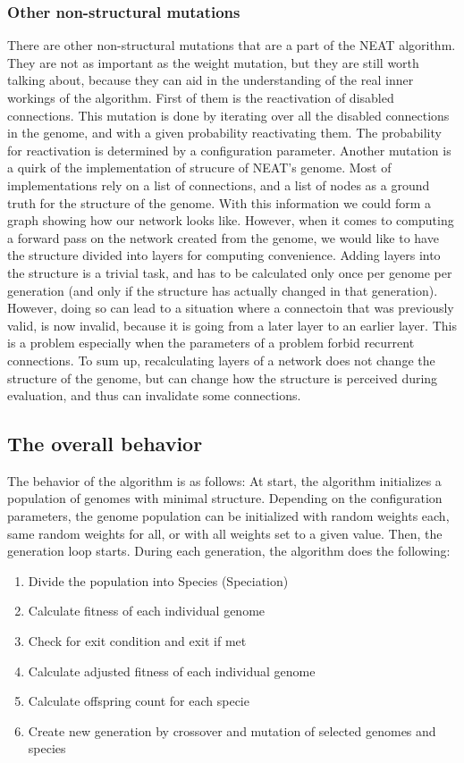 \documentclass{article}
\begin{document}
\subsubsection{Other non-structural mutations}
There are other non-structural mutations that are a part of the NEAT algorithm. They are not as important as the weight mutation, but they are still worth
talking about, because they can aid in the understanding of the real inner workings of the algorithm.
First of them is the reactivation of disabled connections. This mutation is done by iterating over all the disabled connections in the genome, and with a given
probability reactivating them. The probability for reactivation is determined by a configuration parameter.
Another mutation is a quirk of the implementation of strucure of NEAT's genome. Most of implementations rely on a list of connections, and a list of nodes as a 
ground truth for the structure of the genome. With this information we could form a graph showing how our network looks like. However, when it comes to 
computing a forward pass on the network created from the genome, we would like to have the structure divided into layers for computing convenience.
Adding layers into the structure is a trivial task, and has to be calculated only once per genome per generation (and only if the structure has actually 
changed in that generation). However, doing so can lead to a situation where a connectoin that was previously valid, is now invalid, because it
is going from a later layer to an earlier layer. This is a problem especially when the parameters of a problem forbid recurrent connections. To sum up, 
recalculating layers of a network does not change the structure of the genome, but can change how the structure is perceived during evaluation, and thus
can invalidate some connections.
\subsection{The overall behavior}
The behavior of the algorithm is as follows: 
At start, the algorithm initializes a population of genomes with minimal structure. Depending on the configuration parameters,
the genome population can be initialized with random weights each, same random weights for all, or with all weights set to a given value.
Then, the generation loop starts. During each generation, the algorithm does the following:
    \begin{enumerate}
        \item Divide the population into Species (Speciation)
        \item Calculate fitness of each individual genome
        \item Check for exit condition and exit if met
        \item Calculate adjusted fitness of each individual genome
        \item Calculate offspring count for each specie
        \item Create new generation by crossover and mutation of selected genomes and species
    \end{enumerate}
\end{document}
